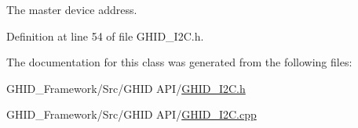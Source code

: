 \-The master device address. 



\-Definition at line 54 of file \-G\-H\-I\-D\-\_\-\-I2\-C.\-h.



\-The documentation for this class was generated from the following files\-:\begin{DoxyCompactItemize}
\item 
\-G\-H\-I\-D\-\_\-\-Framework/\-Src/\-G\-H\-I\-D A\-P\-I/\hyperlink{_g_h_i_d___i2_c_8h}{\-G\-H\-I\-D\-\_\-\-I2\-C.\-h}\item 
\-G\-H\-I\-D\-\_\-\-Framework/\-Src/\-G\-H\-I\-D A\-P\-I/\hyperlink{_g_h_i_d___i2_c_8cpp}{\-G\-H\-I\-D\-\_\-\-I2\-C.\-cpp}\end{DoxyCompactItemize}
